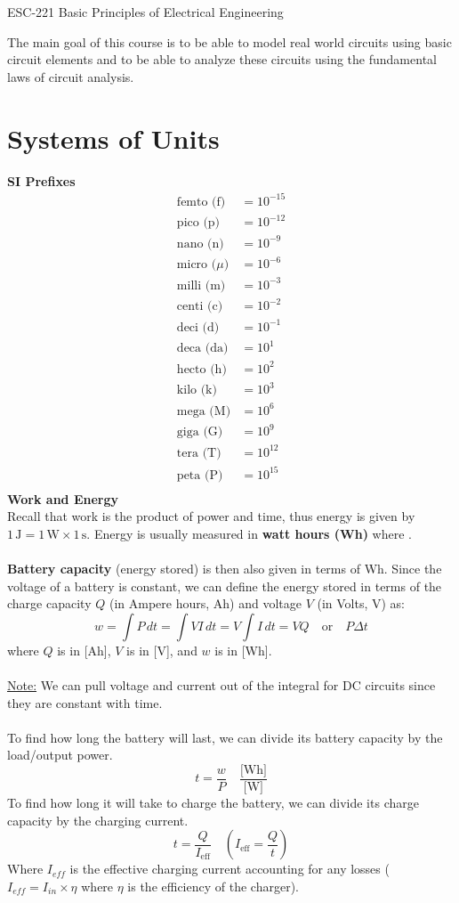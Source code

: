 \documentclass[12pt]{article}
\title{}
\date{}
\author{}
\begin{document}
\begin{center}
{\LARGE ESC-221 Basic Principles of Electrical Engineering\par}
\end{center}
The main goal of this course is to be able to model real world circuits using basic circuit elements and to be able to analyze these circuits using the fundamental laws of circuit analysis.
\section*{Systems of Units}
\textbf{SI Prefixes}
\[\begin{aligned}
\text{femto (f)}  &= 10^{-15} \\
\text{pico (p)}   &= 10^{-12} \\
\text{nano (n)}   &= 10^{-9} \\
\text{micro ($\mu$)}  &= 10^{-6} \\
\text{milli (m)}  &= 10^{-3} \\
\text{centi (c)}  &= 10^{-2} \\
\text{deci (d)}   &= 10^{-1} \\
\text{deca (da)}  &= 10^{1} \\
\text{hecto (h)}  &= 10^{2} \\
\text{kilo (k)}   &= 10^{3} \\
\text{mega (M)}   &= 10^{6} \\
\text{giga (G)}   &= 10^{9} \\
\text{tera (T)}   &= 10^{12} \\
\text{peta (P)}   &= 10^{15} \\
\end{aligned}\]
\textbf{Work and Energy}\\
Recall that work is the product of power and time, thus energy is given by $\boxed{1\,\text{J} = 1\,\text{W} \times 1\,\text{s}}$. Energy is usually measured in \textbf{watt hours (Wh)} where .\\\\
\textbf{Battery capacity} (energy stored) is then also given in terms of Wh. Since the voltage of a battery is constant, we can define the energy stored in terms of the charge capacity $Q$ (in Ampere hours, Ah) and voltage $V$ (in Volts, V) as:
\[w = \int P\,dt = \int VI\,dt = V\int I\,dt = VQ\quad\text{or}\quad P\Delta t\]
where $Q$ is in [Ah], $V$ is in [V], and $w$ is in [Wh].\\\\
\underline{Note:} We can pull voltage and current out of the integral for DC circuits since they are constant with time.\\\\
To find how long the battery will last, we can divide its battery capacity by the load/output power.
\[t = \frac{w}{P}\quad \frac{\text{[Wh]}}{\text{[W]}}\]
To find how long it will take to charge the battery, we can divide its charge capacity by the charging current.
\[t = \frac{Q}{I_{\text{eff}}}\quad \left(I_{\text{eff}} = \frac{Q}{t}\right)\]
Where $I_{eff}$ is the effective charging current accounting for any losses ($I_{eff} = I_{in} \times \eta$ where $\eta$ is the efficiency of the charger).
\end{document}
